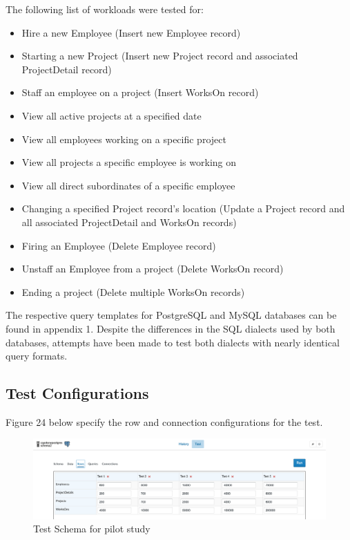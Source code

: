 \documentclass[12pt]{article}
\begin{document}
\begin{spacing}{1.9}
	The following list of workloads were tested for:
	\begin{itemize}
		
		\item Hire a new Employee (Insert new Employee record)
		\item Starting a new Project (Insert new Project record and associated ProjectDetail record)
		\item Staff an employee on a project (Insert WorksOn record)
		\item View all active projects at a specified date
		\item View all employees working on a specific project
		\item View all projects a specific employee is working on
		\item View all direct subordinates of a specific employee
		\item Changing a specified Project record's location (Update a Project record and all associated ProjectDetail and WorksOn records)
		\item Firing an Employee (Delete Employee record)
		\item Unstaff an Employee from a project (Delete WorksOn record)
		\item Ending a project (Delete multiple WorksOn records)
	\end{itemize}
	
	The respective query templates for PostgreSQL and MySQL databases can be found in appendix 1. Despite the differences in the SQL dialects used by both databases, attempts have been made to test both dialects with nearly identical query formats.
	
	\subsection{ Test Configurations}
	
	Figure 24 below specify the row and connection configurations for the test.
	
	\begin{figure}[H]
		\centering
		\includegraphics[width=\textwidth]{4-3.png}
		\caption{Test Schema for pilot study }
		

\end{figure}
\end{spacing}
\end{document}
